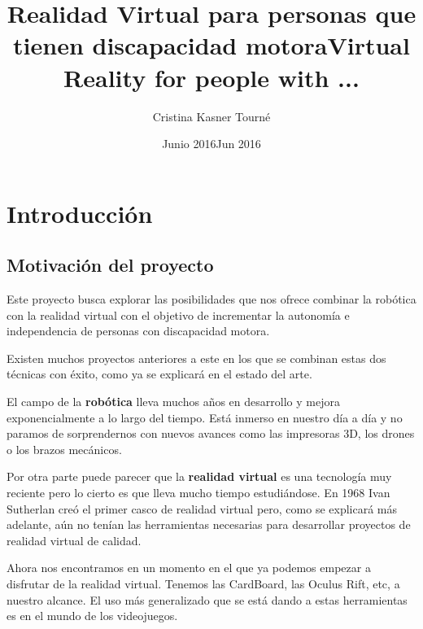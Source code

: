 \documentclass[twoside, 12pt]{epstfg}
\title[spa]{Realidad Virtual para personas que tienen discapacidad motora}
\title[eng]{Virtual Reality for people with ...}
\author{Cristina Kasner Tourné}
\date[spa]{Junio 2016}
\date[eng]{Jun 2016}
\begin{document}

\frontmatter

\maketitle[spa]

\makeinnertitle[spa]

\makeabstract[spa]
\makeabstract[eng]

\tableofcontents
\clearpage
\listoftables
\clearpage
\listoffigures
\cleardoublepage

\printnoidxglossaries

\mainmatter
\chapter{Introducción} 


\section{Motivación del proyecto}

Este proyecto busca explorar las posibilidades que nos ofrece combinar la robótica con la realidad virtual con el objetivo de incrementar la autonomía e independencia de personas con discapacidad motora.

Existen muchos proyectos anteriores a este en los que se combinan estas dos técnicas con éxito, como ya se explicará en el estado del arte.

El campo de la \textbf{robótica} lleva muchos años en desarrollo y mejora exponencialmente a lo largo del tiempo. Está inmerso en nuestro día a día y no paramos de sorprendernos con nuevos avances como las impresoras 3D, los drones o los brazos mecánicos.

Por otra parte puede parecer que la \textbf{realidad virtual} es una tecnología muy reciente pero lo cierto es que  lleva mucho tiempo estudiándose. En 1968 Ivan Sutherlan creó el primer casco de realidad virtual pero, como se explicará más adelante, aún no tenían las herramientas necesarias para desarrollar proyectos de realidad virtual de calidad.

Ahora nos encontramos en un momento en el que ya podemos empezar a disfrutar de la realidad virtual. Tenemos las CardBoard, las Oculus Rift, etc, a nuestro alcance.
El uso más generalizado que se está dando a estas herramientas es en el mundo de los videojuegos.
\end{document}
